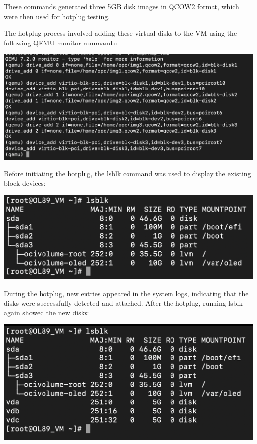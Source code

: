 These commands generated three 5GB disk images in QCOW2 format, which were then used for hotplug testing.\mynewline

The hotplug process involved adding these virtual disks to the VM using the following QEMU monitor commands:

\begin{center}
    \centering
    \includegraphics[width=\textwidth]{Images/3 vDisk Hotplug.png}
    \label{fig}
\end{center}

Before initiating the hotplug, the lsblk command was used to display the existing block devices:

\begin{center}
    \centering
    \includegraphics[width=\textwidth]{Images/lsblk before hotplug.png}
    \label{fig}
\end{center}

During the hotplug, new entries appeared in the system logs, indicating that the disks were successfully detected and attached. After the hotplug, running lsblk again showed the new disks:

\begin{center}
    \centering
    \includegraphics[width=\textwidth]{Images/lsblk after hotplug.png}
    \label{fig}
\end{center}

